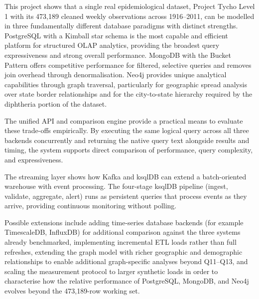 \documentclass[12pt,a4paper]{article}
\begin{document}
This project shows that a single real epidemiological dataset, Project Tycho Level 1 with its 473{,}189 cleaned weekly observations across 1916--2011, can be modelled in three fundamentally different database paradigms with distinct strengths. PostgreSQL with a Kimball star schema is the most capable and efficient platform for structured OLAP analytics, providing the broadest query expressiveness and strong overall performance. MongoDB with the Bucket Pattern offers competitive performance for filtered, selective queries and removes join overhead through denormalisation. Neo4j provides unique analytical capabilities through graph traversal, particularly for geographic spread analysis over state border relationships and for the city-to-state hierarchy required by the diphtheria portion of the dataset.

The unified API and comparison engine provide a practical means to evaluate these trade-offs empirically. By executing the same logical query across all three backends concurrently and returning the native query text alongside results and timing, the system supports direct comparison of performance, query complexity, and expressiveness.

The streaming layer shows how Kafka and ksqlDB can extend a batch-oriented warehouse with event processing. The four-stage ksqlDB pipeline (ingest, validate, aggregate, alert) runs as persistent queries that process events as they arrive, providing continuous monitoring without polling.

Possible extensions include adding time-series database backends (for example TimescaleDB, InfluxDB) for additional comparison against the three systems already benchmarked, implementing incremental ETL loads rather than full refreshes, extending the graph model with richer geographic and demographic relationships to enable additional graph-specific analyses beyond Q11--Q13, and scaling the measurement protocol to larger synthetic loads in order to characterise how the relative performance of PostgreSQL, MongoDB, and Neo4j evolves beyond the 473{,}189-row working set.
\end{document}
